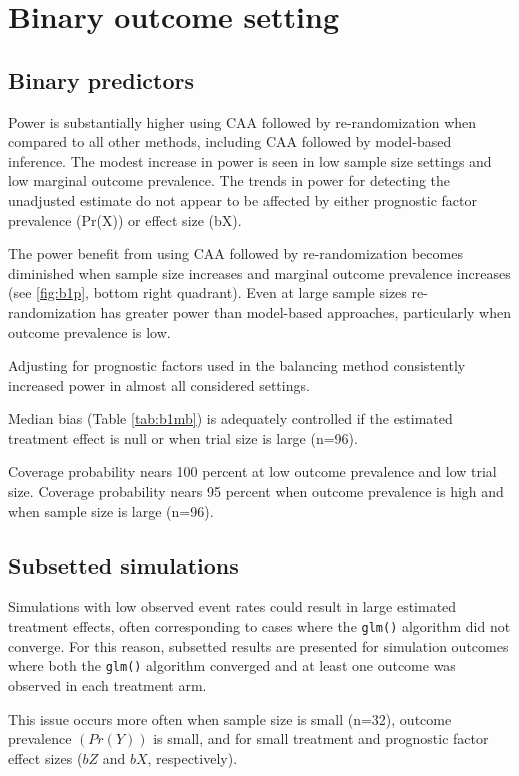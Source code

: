 \section{Binary outcome setting}
\subsection{Binary predictors}
Power is substantially higher using CAA followed by re-randomization when compared to all other methods, including CAA followed by model-based inference.
The modest increase in power is seen in low sample size settings and low marginal outcome prevalence.
The trends in power for detecting the unadjusted estimate do not appear to be affected by either prognostic factor prevalence (Pr(X)) or effect size (bX). 

The power benefit from using CAA followed by re-randomization becomes diminished when sample size increases and marginal outcome prevalence increases (see \ref{fig:b1p}, bottom right quadrant).
Even at large sample sizes re-randomization has greater power than model-based approaches, particularly when outcome prevalence is low.

Adjusting for prognostic factors used in the balancing method consistently increased power in almost all considered settings.

Median bias (Table \ref{tab:b1mb}) is adequately controlled if the estimated treatment effect is null or when trial size is large (n=96).

Coverage probability nears 100 percent at low outcome prevalence and low trial size.
Coverage probability nears 95 percent when outcome prevalence is high and when sample size is large (n=96).

\subsection{Subsetted simulations}
Simulations with low observed event rates could result in large estimated treatment effects, often corresponding to cases where the \texttt{glm()} algorithm did not converge.
For this reason, subsetted results are presented for simulation outcomes where both the \texttt{glm()} algorithm converged and at least one outcome was observed in each treatment arm.

This issue occurs more often when sample size is small (n=32), outcome prevalence $(Pr(Y))$ is small, and for small treatment and prognostic factor effect sizes ($bZ$ and $bX$, respectively).

